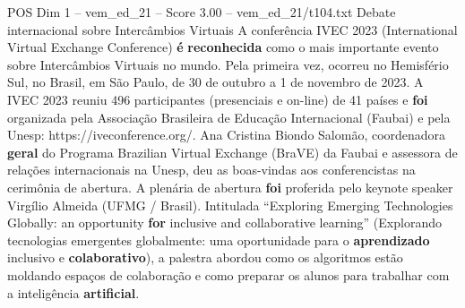 \begin{textsample}{POS Dim 1 – vem\_ed\_21 – Score 3.00 – vem\_ed\_21/t104.txt}  \label{ex:f1_pos_171}
Debate internacional sobre Intercâmbios Virtuais A conferência IVEC 2023 (International Virtual Exchange Conference) \textbf{é} \textbf{reconhecida} como o mais importante evento sobre Intercâmbios Virtuais no mundo.
Pela primeira vez, ocorreu no Hemisfério Sul, no Brasil, em São Paulo, de 30 de outubro a 1 de novembro de 2023.
A IVEC 2023 reuniu 496 participantes (presenciais e on-line) de 41 países e \textbf{foi} organizada pela Associação Brasileira de Educação Internacional (Faubai) e pela Unesp: https://iveconference.org/.
Ana Cristina Biondo Salomão, coordenadora \textbf{geral} do Programa Brazilian Virtual Exchange (BraVE) da Faubai e assessora de relações internacionais na Unesp, deu as boas-vindas aos conferencistas na cerimônia de abertura.
A plenária de abertura \textbf{foi} proferida pelo keynote speaker Virgílio Almeida (UFMG / Brasil).
Intitulada “Exploring Emerging Technologies Globally: an opportunity \textbf{for} inclusive and collaborative learning” (Explorando tecnologias emergentes globalmente: uma oportunidade para o \textbf{aprendizado} inclusivo e \textbf{colaborativo}), a palestra abordou como os algoritmos estão moldando espaços de colaboração e como preparar os alunos para trabalhar com a inteligência \textbf{artificial}.

\end{textsample}
